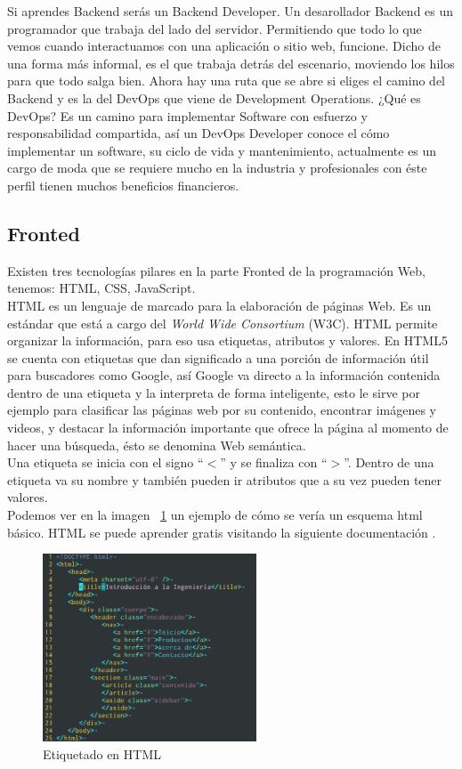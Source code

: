 \documentclass[twocolumns,a4paper]{IEEEtran}
\begin{document}
Si aprendes Backend serás un Backend Developer.
Un desarollador Backend es un programador que trabaja del lado del servidor.
Permitiendo que todo lo que vemos cuando interactuamos con una aplicación o
sitio web, funcione. Dicho de una forma más informal, es el que trabaja detrás
del escenario, moviendo los hilos para que todo salga bien.
Ahora hay una ruta que se abre si eliges el camino del Backend y es la del
DevOps que viene de Development Operations. ¿Qué es DevOps? Es un camino para
implementar Software con esfuerzo y responsabilidad compartida, así un DevOps
Developer conoce el cómo implementar un software, su ciclo de vida y
mantenimiento, actualmente es un cargo de moda que se requiere mucho en la
industria y profesionales con éste perfil tienen muchos beneficios
financieros.\\


\subsection{Fronted}
Existen tres tecnologías pilares en la parte Fronted de la programación Web,
tenemos: HTML, CSS, JavaScript.\\
HTML es un lenguaje de marcado para la elaboración de páginas Web. Es un
estándar que está a cargo del \textit{World Wide Consortium} (W3C). HTML
permite organizar la información, para eso usa etiquetas, atributos y valores.
En HTML5 se cuenta con etiquetas que dan significado a una porción de
información útil para buscadores como Google, así Google va directo a la
información contenida dentro de una etiqueta y la interpreta de forma
inteligente, esto le sirve por ejemplo para clasificar las páginas web por su
contenido, encontrar imágenes y videos, y destacar la información importante
que ofrece la página al momento de hacer una búsqueda, ésto se denomina Web
semántica.\\
Una etiqueta se inicia con el signo ``$<$'' y se finaliza con ``$>$''. Dentro
de una etiqueta va su nombre y también pueden ir atributos que a su vez pueden
tener valores.\\
Podemos ver en la imagen ~\ref{fig:html_etiquetado} un ejemplo de cómo se vería
un esquema html básico. HTML se puede aprender gratis visitando la siguiente
documentación \cite{HTMLw3:2018:online}.

\begin{figure}[ht]
   \centering
      \includegraphics[width=2.5in]{./pictures/html.png}
   \caption{Etiquetado en HTML}
   \label{fig:html_etiquetado}
\end{figure}
\end{document}

